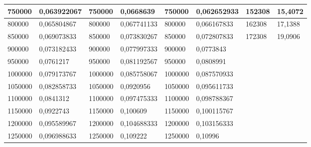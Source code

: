 \documentclass[11pt,openany]{book}
\begin{document}
\begin{table}[!ht]
\begin{tabular}{|l|l|l|l|l|l|l|l|}
        750000 & 0,063922067 & 750000 & 0,0668639 & 750000 & 0,062652933 & 152308 & 15,4072 \\ \hline
        800000 & 0,065804867 & 800000 & 0,067741133 & 800000 & 0,066167833 & 162308 & 17,1388 \\ \hline
        850000 & 0,069073833 & 850000 & 0,073830267 & 850000 & 0,072807833 & 172308 & 19,0906 \\ \hline
        900000 & 0,073182433 & 900000 & 0,077997333 & 900000 & 0,0773843 & ~ & ~ \\ \hline
        950000 & 0,0761217 & 950000 & 0,081192567 & 950000 & 0,0808991 & ~ & ~ \\ \hline
        1000000 & 0,079173767 & 1000000 & 0,085758067 & 1000000 & 0,087570933 & ~ & ~ \\ \hline
        1050000 & 0,082858733 & 1050000 & 0,0920956 & 1050000 & 0,095611733 & ~ & ~ \\ \hline
        1100000 & 0,0841312 & 1100000 & 0,097475333 & 1100000 & 0,098788367 & ~ & ~ \\ \hline
        1150000 & 0,0922743 & 1150000 & 0,100609 & 1150000 & 0,100115767 & ~ & ~ \\ \hline
        1200000 & 0,095589967 & 1200000 & 0,104688333 & 1200000 & 0,103156333 & ~ & ~ \\ \hline
        1250000 & 0,096988633 & 1250000 & 0,109222 & 1250000 & 0,10996 & ~ & \\\hline
    \end{tabular}
\end{table}
\end{document}
